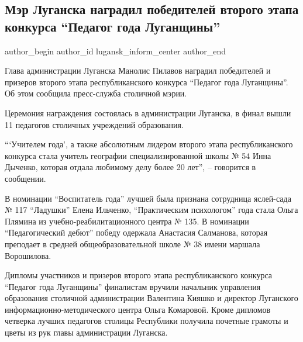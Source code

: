  
 
 
 
 
 
\subsection{Мэр Луганска наградил победителей второго этапа конкурса \enquote{Педагог года Луганщины}}
\label{sec:04_12_2020.news.lnr.lug_info.lugansk_inform_center.2.pedagog_goda}
\ifcmt
	author_begin
   author_id lugansk_inform_center
	author_end
\fi


Глава администрации Луганска Манолис Пилавов наградил победителей и призеров
второго этапа республиканского конкурса \enquote{Педагог года Луганщины}. Об этом
сообщила пресс-служба столичной мэрии.

Церемония награждения состоялась в администрации Луганска, в финал вышли 11
педагогов столичных учреждений образования.

\enquote{\enquote{Учителем года}, а также абсолютным лидером второго этапа республиканского
конкурса стала учитель географии специализированной школы № 54 Инна Дыченко,
которая отдала любимому делу более 20 лет}, – говорится в сообщении.

В номинации \enquote{Воспитатель года} лучшей была признана сотрудница яслей-сада № 117
\enquote{Ладушки} Елена Ильченко, \enquote{Практическим психологом} года стала Ольга Плямина из
учебно-реабилитационного центра № 135. В номинации \enquote{Педагогический дебют}
победу одержала Анастасия Салманова, которая преподает в средней
общеобразовательной школе № 38 имени маршала Ворошилова.

Дипломы участников и призеров второго этапа республиканского конкурса \enquote{Педагог
года Луганщины} финалистам вручили начальник управления образования столичной
администрации Валентина Кияшко и директор Луганского
информационно-методического центра Ольга Комаровой. Кроме дипломов четверка
лучших педагогов столицы Республики получила почетные грамоты и цветы из рук
главы администрации Луганска.

